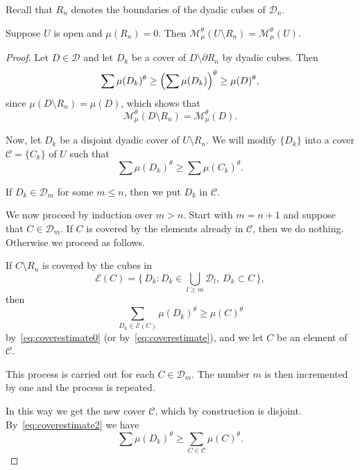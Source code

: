 \documentclass[AHL,Unicode,longabstracts]{cedram}
\begin{document}
Recall that $R_n$ denotes the boundaries of the dyadic cubes of $\mathscr{D}_n$.

\begin{lemm}\label{lem:opensets}
Suppose $U$ is open and $\mu (R_n) = 0$. Then $\mathscr{M}_\mu^\theta (U \setminus R_n) = \mathscr{M}_\mu^\theta (U)$.
\end{lemm}

\begin{proof}
Let $D \in \mathscr{D}$ and let $D_k$ be a cover of $D \setminus
\partial R_n$ by dyadic cubes. Then
\begin{equation}\label{eq:coverestimate0}
\sum \mu (D_k)^\theta \geq \Bigl(\sum \mu(D_k) \Bigr)^\theta \geq
\mu (D)^\theta,
\end{equation}
since $\mu (D \setminus R_n) = \mu (D)$, which shows that
\begin{equation}\label{eq:coverestimate}
\mathscr{M}_\mu^\theta (D \setminus R_n) = \mathscr{M}_\mu^\theta (D).
\end{equation}

Now, let $D_k$ be a disjoint dyadic cover of $U \setminus R_n$. We will modify $\{D_k\}$ into a cover $\mathscr{C} = \{C_k\}$ of $U$ such that
\[
\sum \mu (D_k)^\theta \geq \sum \mu (C_k)^\theta.
\]

If $D_k \in \mathscr{D}_m$ for some $m \leq n$, then we put $D_k$ in $\mathscr{C}$.

We now proceed by induction over $m > n$. Start with $m = n +1$ and suppose that $C \in \mathscr{D}_m$. If $C$ is covered by the elements already in $\mathscr{C}$, then we do nothing. Otherwise we proceed as follows.

If $C \setminus R_n$ is covered by the cubes in
\[
\mathscr{E} (C) = \biggl\{\, D_k : D_k \in \bigcup_{l \geq m}
\mathscr{D}_l,\ D_k \subset C\, \biggr\},
\]
then
\begin{equation}\label{eq:coverestimate2}
\sum_{D_k \in \mathscr{E} (C)} \mu (D_k)^\theta \geq \mu (C)^\theta
\end{equation}
by~\eqref{eq:coverestimate0} (or by~\eqref{eq:coverestimate}), and we let $C$ be an element of $\mathscr{C}$.

This process is carried out for each $C \in \mathscr{D}_m$. The number $m$ is then incremented by one and the process is repeated.

In this way we get the new cover $\mathscr{C}$, which by construction is disjoint. By~\eqref{eq:coverestimate2} we have
\begin{equation}\label{eq:coverestimate3}
\sum \mu (D_k)^\theta \geq \sum_{C \in \mathscr{C}} \mu (C)^\theta.
\end{equation}


\end{proof}
\end{document}

